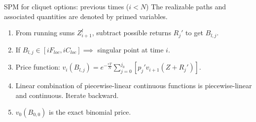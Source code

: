 \documentclass[utf8,t,xcolor=svgnames]{beamer}
\begin{document}
\begin{frame}{SPM for cliquet options: previous times ($ i < N $)}
	The realizable paths and associated quantities are denoted by primed variables.
	\begin{enumerate}
		\item From running sums $ Z_{i+1}^l $, subtract possible returns $ R_j' $ to get $ B_{l,j} $.
		\item If $ B_{l,j} \in [ i F_{loc}, i C_{loc} ] \implies $ singular point at time $ i $.
		\item Price function: $ v_i (B_{l,j}) = e^{- \frac{rT}{N}} \sum_{j=0}^{j_0} \left[ p_j' v_{i+1} (Z + R_j') \right] $.
		\item Linear combination of piecewise-linear continuous functions is piecewise-linear and continuous. Iterate backward.
		\item $ v_0 (B_{0,0}) $ is the exact binomial price.
	\end{enumerate}
\end{frame}
\end{document}
